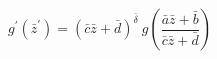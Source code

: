 \begin{equation}
g^{'}({\bar{z}}^{'})= (\bar{c} \bar{z}+\bar{d})^{\bar{\delta}}~g(\frac{\bar{a}
\bar{z}+\bar{b}}{\bar{c} \bar{z}+\bar{d}})
\end{equation}

